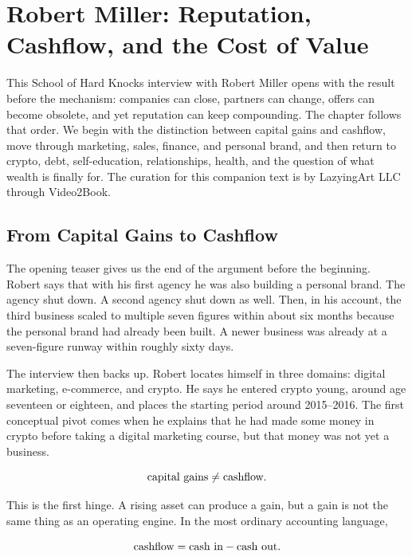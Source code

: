 \chapter{Robert Miller: Reputation, Cashflow, and the Cost of Value}

This School of Hard Knocks interview with Robert Miller opens with the result before the mechanism: companies can close, partners can change, offers can become obsolete, and yet reputation can keep compounding. The chapter follows that order. We begin with the distinction between capital gains and cashflow, move through marketing, sales, finance, and personal brand, and then return to crypto, debt, self-education, relationships, health, and the question of what wealth is finally for. The curation for this companion text is by LazyingArt LLC through Video2Book.

\section{From Capital Gains to Cashflow}

The opening teaser gives us the end of the argument before the beginning. Robert says that with his first agency he was also building a personal brand. The agency shut down. A second agency shut down as well. Then, in his account, the third business scaled to multiple seven figures within about six months because the personal brand had already been built. A newer business was already at a seven-figure runway within roughly sixty days.

The interview then backs up. Robert locates himself in three domains: digital marketing, e-commerce, and crypto. He says he entered crypto young, around age seventeen or eighteen, and places the starting period around 2015--2016. The first conceptual pivot comes when he explains that he had made some money in crypto before taking a digital marketing course, but that money was not yet a business.

\begin{equation}
\hbox{capital gains} \neq \hbox{cashflow}.
\end{equation}

This is the first hinge. A rising asset can produce a gain, but a gain is not the same thing as an operating engine. In the most ordinary accounting language,

\begin{equation}
\hbox{cashflow} = \hbox{cash in} - \hbox{cash out}.
\end{equation}

